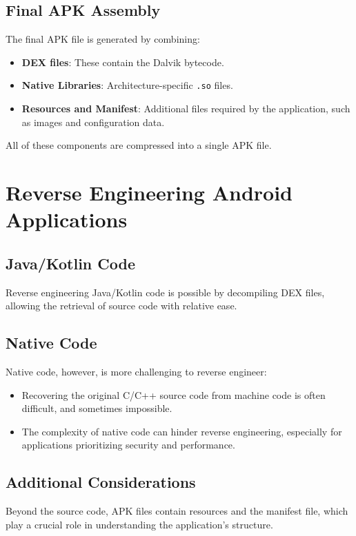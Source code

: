 \documentclass{article}
\begin{document}
\subsection{Final APK Assembly}
The final APK file is generated by combining:
\begin{itemize}
    \item \textbf{DEX files}: These contain the Dalvik bytecode.
    \item \textbf{Native Libraries}: Architecture-specific \texttt{.so} files.
    \item \textbf{Resources and Manifest}: Additional files required by the application, such as images and configuration data.
\end{itemize}

All of these components are compressed into a single APK file.

\section{Reverse Engineering Android Applications}
\subsection{Java/Kotlin Code}
Reverse engineering Java/Kotlin code is possible by decompiling DEX files, allowing the retrieval of source code with relative ease.

\subsection{Native Code}
Native code, however, is more challenging to reverse engineer:
\begin{itemize}
    \item Recovering the original C/C++ source code from machine code is often difficult, and sometimes impossible.
    \item The complexity of native code can hinder reverse engineering, especially for applications prioritizing security and performance.
\end{itemize}

\subsection{Additional Considerations}
Beyond the source code, APK files contain resources and the manifest file, which play a crucial role in understanding the application’s structure.
\end{document}
